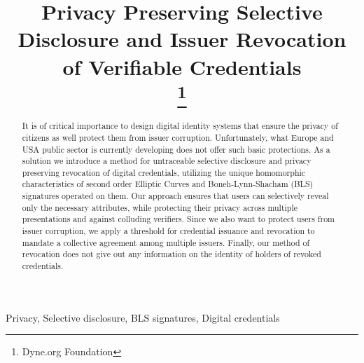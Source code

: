 \documentclass[conference]{IEEEtran}
\begin{document}
\title{Privacy Preserving Selective Disclosure and Issuer Revocation of Verifiable Credentials\\
\thanks{Dyne.org Foundation}
}

\author{
\and
{}
}

\maketitle

\begin{abstract}

It is of critical importance to design digital identity systems that
ensure the privacy of citizens as well protect them from issuer
corruption. Unfortunately, what Europe and USA public sector is
currently developing does not offer such basic protections. As a
solution we introduce a method for untraceable selective disclosure
and privacy preserving revocation of digital credentials, utilizing
the unique homomorphic characteristics of second order Elliptic Curves
and Boneh-Lynn-Shacham (BLS) signatures operated on them. Our approach
ensures that users can selectively reveal only the necessary
attributes, while protecting their privacy across multiple
presentations and against colluding verifiers. Since we also want to
protect users from issuer corruption, we apply a threshold for
credential issuance and revocation to mandate a collective agreement
among multiple issuers. Finally, our method of revocation does not
give out any information on the identity of holders of revoked
credentials.

\end{abstract}

\begin{IEEEkeywords}
Privacy, Selective disclosure, BLS signatures, Digital credentials
\end{IEEEkeywords}
\end{document}
